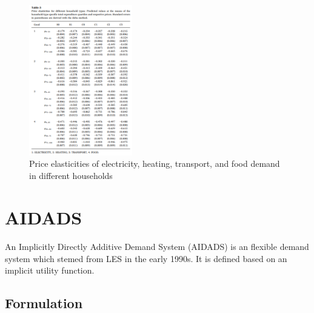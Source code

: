 \begin{figure}[h]  %
	\centering
	\includegraphics[width=0.4\textwidth]{./figure/ch2/fig2.5_table5.png}
	\caption{Price elasticities of electricity, heating, transport, and food demand in different households}\label{fig2.5}
\end{figure}


\section{AIDADS}
\paragraph{}{An Implicitly Directly Additive Demand System (AIDADS) is an flexible demand system which stemed from LES in the early 1990s. It is defined based on an implicit utility function. }

\subsection{Formulation}
